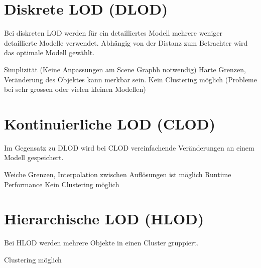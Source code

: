 \section{Diskrete LOD (DLOD)}
Bei diskreten LOD werden für ein detailliertes Modell mehrere weniger detaillierte Modelle verwendet.
Abhängig von der Distanz zum Betrachter wird das optimale Modell gewählt.
\begin{itemize}
  \pro Simplizität (Keine Anpassungen am Scene Graphh notwendig)
  \con Harte Grenzen, Veränderung des Objektes kann merkbar sein.
  \con Kein Clustering möglich (Probleme bei sehr grossen oder vielen kleinen Modellen)
\end{itemize}

\section{Kontinuierliche LOD (CLOD)}
Im Gegensatz zu DLOD wird bei CLOD vereinfachende Veränderungen an einem Modell gespeichert.
\begin{itemize}
  \pro Weiche Grenzen, Interpolation zwischen Auflösungen ist möglich
  \con Runtime Performance
  \con Kein Clustering möglich
\end{itemize}

\section{Hierarchische LOD (HLOD)}
Bei HLOD werden mehrere Objekte in einen Cluster gruppiert.
\begin{itemize}
  \pro Clustering möglich
\end{itemize}
